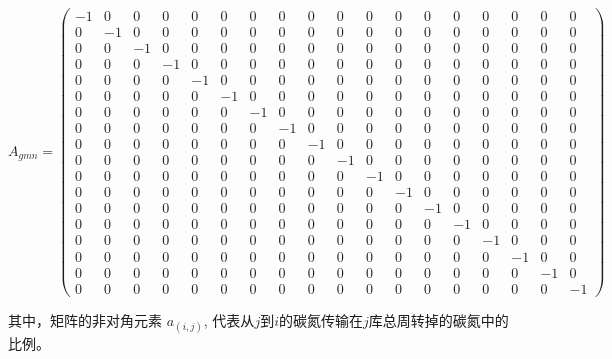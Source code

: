 \begin{landscape}
    \enlargethispage{55pt}
      \begin{equation}
        A_{gmn}=\left(\begin{array}{rrrrrrrrrrrrrrrrrrrrrrrrrrrrrr}
          -1 & 0 & 0 & 0 & 0 & 0 & 0 & 0 & 0 & 0 & 0 & 0 & 0 & 0 & 0 & 0 & 0 & 0 \\
           0 & -1 & 0 & 0 & 0 & 0 & 0 & 0 & 0 & 0 & 0 & 0 & 0 & 0 & 0 & 0 & 0 & 0 \\ 
           0 & 0 & -1 & 0 & 0 & 0 & 0 & 0 & 0 & 0 & 0 & 0 & 0 & 0 & 0 & 0 & 0 & 0 \\ 
           0 & 0 & 0 & -1 & 0 & 0 & 0 & 0 & 0 & 0 & 0 & 0 & 0 & 0 & 0 & 0 & 0 & 0 \\ 
           0 & 0 & 0 & 0 & -1 & 0 & 0 & 0 & 0 & 0 & 0 & 0 & 0 & 0 & 0 & 0 & 0 & 0 \\
           0 & 0 & 0 & 0 & 0 & -1 & 0 & 0 & 0 & 0 & 0 & 0 & 0 & 0 & 0 & 0 & 0 & 0 \\ 
           0 & 0 & 0 & 0 & 0 & 0 & -1 & 0 & 0 & 0 & 0 & 0 & 0 & 0 & 0 & 0 & 0 & 0 \\ 
           0 & 0 & 0 & 0 & 0 & 0 & 0 & -1 & 0 & 0 & 0 & 0 & 0 & 0 & 0 & 0 & 0 & 0 \\ 
           0 & 0 & 0 & 0 & 0 & 0 & 0 & 0 & -1 & 0 & 0 & 0 & 0 & 0 & 0 & 0 & 0 & 0 \\ 
           0 & 0 & 0 & 0 & 0 & 0 & 0 & 0 & 0 & -1 & 0 & 0 & 0 & 0 & 0 & 0 & 0 & 0 \\ 
           0 & 0 & 0 & 0 & 0 & 0 & 0 & 0 & 0 & 0 & -1 & 0 & 0 & 0 & 0 & 0 & 0 & 0 \\ 
           0 & 0 & 0 & 0 & 0 & 0 & 0 & 0 & 0 & 0 & 0 & -1 & 0 & 0 & 0 & 0 & 0 & 0 \\ 
           0 & 0 & 0 & 0 & 0 & 0 & 0 & 0 & 0 & 0 & 0 & 0 & -1 & 0 & 0 & 0 & 0 & 0 \\ 
           0 & 0 & 0 & 0 & 0 & 0 & 0 & 0 & 0 & 0 & 0 & 0 & 0 & -1 & 0 & 0 & 0 & 0 \\ 
           0 & 0 & 0 & 0 & 0 & 0 & 0 & 0 & 0 & 0 & 0 & 0 & 0 & 0 & -1 & 0 & 0 & 0 \\
           0 & 0 & 0 & 0 & 0 & 0 & 0 & 0 & 0 & 0 & 0 & 0 & 0 & 0 & 0 & -1 & 0 & 0 \\ 
           0 & 0 & 0 & 0 & 0 & 0 & 0 & 0 & 0 & 0 & 0 & 0 & 0 & 0 & 0 & 0 & -1 &0 \\
           0 & 0 & 0 & 0 & 0 & 0 & 0 & 0 & 0 & 0 & 0 & 0 & 0 & 0 & 0 & 0 & 0 & -1\end{array}\right)
        \end{equation}
\end{landscape}
其中，矩阵的非对角元素 $a_{(i,j)}$, 代表从$j$到$i$的碳氮传输在$j$库总周转掉的碳氮中的比例。


